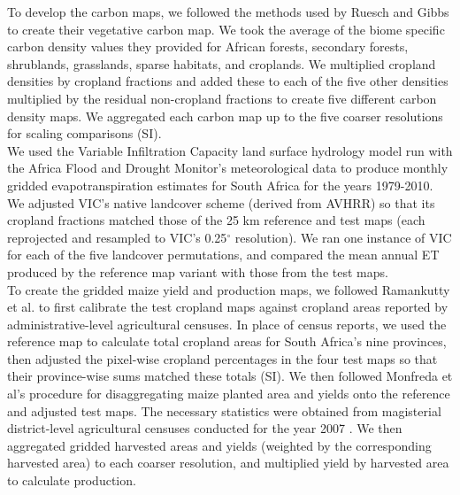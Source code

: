 \documentclass{pnastwo2}
\begin{document}
\begin{article}
\begin{materials}
\indent To develop the carbon maps, we followed the methods used by Ruesch and Gibbs \cite{ruesch_new_2008} to create their vegetative carbon map. We took the average of the biome specific carbon density values they provided for African forests, secondary forests, shrublands, grasslands, sparse habitats, and croplands. We multiplied cropland densities by cropland fractions and added these to each of the five other densities multiplied by the residual non-cropland fractions to create five different carbon density maps. We aggregated each carbon map up to the five coarser resolutions for scaling comparisons (SI).  \\
\indent We used the Variable Infiltration Capacity \cite{liang_simple_1994} land surface hydrology model run with the Africa Flood and Drought Monitor's meteorological data \cite{sheffield_drought_2013} to produce monthly gridded evapotranspiration estimates for South Africa for the years 1979-2010. We adjusted VIC's native landcover scheme (derived from AVHRR) so that its cropland fractions matched those of the 25 km reference and test maps (each reprojected and resampled to VIC's 0.25$^{\circ}$ resolution). We ran one instance of VIC for each of the five landcover permutations, and compared the mean annual ET produced by the reference map variant with those from the test maps. \\
\indent To create the gridded maize yield and production maps, we followed Ramankutty et al. \cite{ramankutty_farming_2008} to first calibrate the test cropland maps against cropland areas reported by administrative-level agricultural censuses. In place of census reports, we used the reference map to calculate total cropland areas for South Africa's nine provinces, then adjusted the pixel-wise cropland percentages in the four test maps so that their province-wise sums matched these totals (SI). We then followed Monfreda et al's procedure \cite{monfreda_farming_2008} for disaggregating maize \cite[South Africa's largest crop][]{estes_comparing_2013} planted area and yields onto the reference and adjusted test maps. The necessary statistics were obtained from magisterial district-level agricultural censuses conducted for the year 2007 \cite{statistics_south_africa_commercial_2007}. We then aggregated gridded harvested areas and yields (weighted by the corresponding harvested area) to each coarser resolution, and multiplied yield by harvested area to calculate production.\\

\end{materials}
\end{article}
\end{document}
